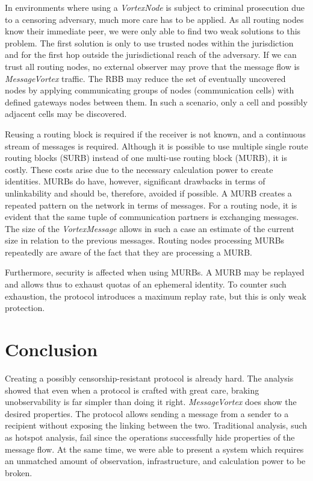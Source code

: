 \documentclass[acmsmall, screen, final, natbib=false]{acmart}
\begin{document}
	In environments where using a \emph{VortexNode} is subject to criminal prosecution due to a censoring adversary, much more care has to be applied. As all routing nodes know their immediate peer, we were only able to find two weak solutions to this problem. The first solution is only to use trusted nodes within the jurisdiction and for the first hop outside the jurisdictional reach of the adversary. If we can trust all routing nodes, no external observer may prove that the message flow is \emph{MessageVortex} traffic. The RBB may reduce the set of eventually uncovered nodes by applying communicating groups of nodes (communication cells) with defined gateways nodes between them. In such a scenario, only a cell and possibly adjacent cells may be discovered.
	
	Reusing a routing block is required if the receiver is not known, and a continuous stream of messages is required. Although it is possible to use multiple single route routing blocks (SURB) instead of one multi-use routing block (MURB), it is costly. These costs arise due to the necessary calculation power to create identities. MURBs do have, however, significant drawbacks in terms of unlinkability and should be, therefore, avoided if possible. A MURB creates a repeated pattern on the network in terms of messages. For a routing node, it is evident that the same tuple of communication partners is exchanging messages. The size of the \emph{VortexMessage} allows in such a case an estimate of the current size in relation to the previous messages. Routing nodes processing MURBs repeatedly are aware of the fact that they are processing a MURB.
	
	Furthermore, security is affected when using MURBs. A MURB may be replayed and allows thus to exhaust quotas of an ephemeral identity. To counter such exhaustion, the protocol introduces a maximum replay rate, but this is only weak protection.
	
	\section{Conclusion}
	Creating a possibly censorship-resistant protocol is already hard. The analysis showed that even when a protocol is crafted with great care, braking unobservability is far simpler than doing it right. \emph{MessageVortex} does show the desired properties. The protocol allows sending a message from a sender to a recipient without exposing the linking between the two. Traditional analysis, such as hotspot analysis, fail since the operations successfully hide properties of the message flow. At the same time, we were able to present a system which requires an unmatched amount of observation, infrastructure, and calculation power to be broken.
	
\end{document}
